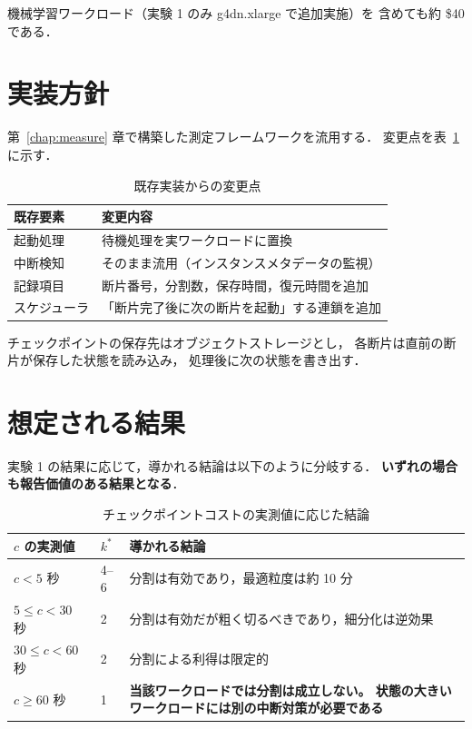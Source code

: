 \documentclass[11pt,a4paper]{ltjsreport}
\begin{document}
機械学習ワークロード（実験 1 のみ g4dn.xlarge で追加実施）を
含めても約 \$40 である．

\section{実装方針}

第~\ref{chap:measure} 章で構築した測定フレームワークを流用する．
変更点を表~\ref{tab:impl} に示す．

\begin{table}[htbp]
\centering
\caption{既存実装からの変更点}
\label{tab:impl}
\small
\begin{tabularx}{\textwidth}{@{}lX@{}}
\toprule
既存要素 & 変更内容 \\
\midrule
起動処理 & 待機処理を実ワークロードに置換 \\
中断検知 & そのまま流用（インスタンスメタデータの監視） \\
記録項目 & 断片番号，分割数，保存時間，復元時間を追加 \\
スケジューラ & 「断片完了後に次の断片を起動」する連鎖を追加 \\
\bottomrule
\end{tabularx}
\end{table}

チェックポイントの保存先はオブジェクトストレージとし，
各断片は直前の断片が保存した状態を読み込み，
処理後に次の状態を書き出す．

\section{想定される結果}

実験 1 の結果に応じて，導かれる結論は以下のように分岐する．
\textbf{いずれの場合も報告価値のある結果となる}．

\begin{table}[htbp]
\centering
\caption{チェックポイントコストの実測値に応じた結論}
\label{tab:outcomes}
\small
\begin{tabularx}{\textwidth}{@{}llX@{}}
\toprule
$c$ の実測値 & $k^{*}$ & 導かれる結論 \\
\midrule
$c < 5$ 秒 & 4--6
  & 分割は有効であり，最適粒度は約 10 分 \\
\addlinespace
$5 \leq c < 30$ 秒 & 2
  & 分割は有効だが粗く切るべきであり，細分化は逆効果 \\
\addlinespace
$30 \leq c < 60$ 秒 & 2
  & 分割による利得は限定的 \\
\addlinespace
$c \geq 60$ 秒 & 1
  & \textbf{当該ワークロードでは分割は成立しない。
    状態の大きいワークロードには別の中断対策が必要である} \\
\bottomrule
\end{tabularx}
\end{table}
\end{document}
